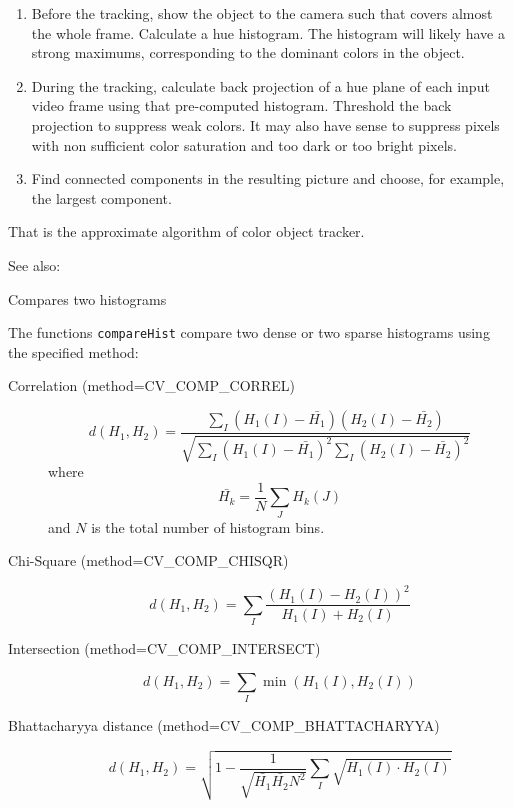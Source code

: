 \begin{enumerate}
 \item Before the tracking, show the object to the camera such that covers almost the whole frame. Calculate a hue histogram. The histogram will likely have a strong maximums, corresponding to the dominant colors in the object.
 \item During the tracking, calculate back projection of a hue plane of each input video frame using that pre-computed histogram. Threshold the back projection to suppress weak colors. It may also have sense to suppress pixels with non sufficient color saturation and too dark or too bright pixels.
 \item Find connected components in the resulting picture and choose, for example, the largest component.
\end{enumerate}

That is the approximate algorithm of  color object tracker.

See also: 

Compares two histograms

\begin{description}
\end{description}

The functions \texttt{compareHist} compare two dense or two sparse histograms using the specified method:

\begin{description}
\item[Correlation (method=CV\_COMP\_CORREL)]
\[
d(H_1,H_2) = \frac
{\sum_I (H_1(I) - \bar{H_1}) (H_2(I) - \bar{H_2})}
{\sqrt{\sum_I(H_1(I) - \bar{H_1})^2 \sum_I(H_2(I) - \bar{H_2})^2}}
\]
where
\[
\bar{H_k} = \frac{1}{N} \sum_J H_k(J)
\]
and $N$ is the total number of histogram bins.

\item[Chi-Square (method=CV\_COMP\_CHISQR)]
\[ d(H_1,H_2) = \sum_I \frac{\left(H_1(I)-H_2(I)\right)^2}{H_1(I)+H_2(I)} \]

\item[Intersection (method=CV\_COMP\_INTERSECT)]
\[ d(H_1,H_2) = \sum_I \min (H_1(I), H_2(I)) \]

\item[Bhattacharyya distance (method=CV\_COMP\_BHATTACHARYYA)]
\[ d(H_1,H_2) = \sqrt{1 - \frac{1}{\sqrt{\bar{H_1} \bar{H_2} N^2}} \sum_I \sqrt{H_1(I) \cdot H_2(I)}} \]

\end{description}

